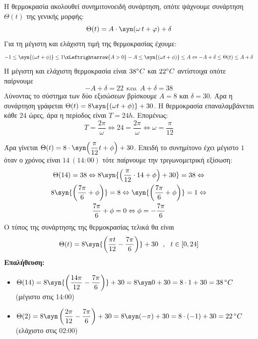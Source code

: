 \lysh
Η θερμοκρασία ακολουθεί συνημιτονοειδή συνάρτηση, οπότε ψάχνουμε συνάρτηση $\Theta(t)$ της γενικής μορφής:
\[ \Theta(t) = A \cdot \syn\!\left(\omega\, t + \varphi\right) + \delta \]
Για τη μέγιστη και ελάχιστη τιμή της θερμοκρασίας έχουμε:
\[-1\leq\syn{(\omega t+\phi)}\leq 1\xLeftrightarrow{A>0}-A\leq\syn{(\omega t+\phi)}\leq A\Leftrightarrow -A+\delta\leq \Theta(t)\leq A+\delta\]
Η μέγιστη και ελάχιστη θερμοκρασία είναι $38\degree C$ και $22\degree C$ αντίστοιχα οπότε παίρνουμε
\[-A+\delta=22\ \ \text{και}\ \ A+\delta=38\]
Λύνοντας το σύστημα των δύο εξισώσεων βρίσκουμε $A=8$ και $\delta=30$. Άρα η συνάρτηση γράφεται $\Theta(t)=8\syn{(\omega t+\phi)}+30$. Η θερμοκρασία επαναλαμβάνεται κάθε $24$ ώρες, άρα η περίοδος είναι $T = 24\si{h}$.  Επομένως:
\[
T=\frac{2\pi}{\omega}\Leftrightarrow 24=\frac{2\pi}{\omega}\Leftrightarrow \omega = \frac{\pi}{12}
\]

Άρα γίνεται $\Theta(t) = 8\cdot\syn\!\left(\dfrac{\pi}{12}t+\phi\right) + 30$. Επειδή το συνημίτονο έχει μέγιστο $1$ όταν ο χρόνος είναι $14\ (14:00)$ τότε παίρνουμε την τριγωνομετρική εξίσωση:
\begin{gather*}
\Theta(14)=38\Leftrightarrow
8\syn{\left(\frac{\pi}{12}\cdot 14+\phi\right)+30}=38\Leftrightarrow\\
8\syn{\left(\frac{7\pi}{6}+\phi\right)}=8\Leftrightarrow
\syn{\left(\frac{7\pi}{6}+\phi\right)}=1\Leftrightarrow\\
\frac{7\pi}{6}+\phi=0\Leftrightarrow\phi=-\frac{7\pi}{6}
\end{gather*}
Ο τύπος της συνάρτησης της θερμοκρασίας τελικά θα είναι
\[\Theta(t)=8\syn{\left(\frac{\pi t}{12}-\frac{7\pi}{6}\right)}+30\ \ ,\ \ t\in[0,24]\]
\textbf{Επαλήθευση:}
\begin{itemize}
  \item $\Theta(14) = 8\syn{\left(\dfrac{14\pi}{12}-\dfrac{7\pi}{6}\right)}+30=8\syn0 + 30 = 8\cdot 1 + 30 = 38\,{}\degree C$ \,(μέγιστο στις 14:00)
  \item $\Theta(2) = 8\syn\left(\dfrac{2\pi}{12}-\dfrac{7\pi}{6}\right) + 30 = 8\syn(-\pi) + 30 = 8\cdot(-1) + 30 = 22\,{}\degree C$ (ελάχιστο στις 02:00)
\end{itemize}

